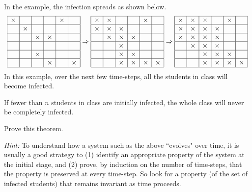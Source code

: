\documentclass[twoside,12pt]{article}
\begin{document}
\begin{problem}{12}
In the example, the infection spreads as shown below.
%
\[
\begin{array}{|c|c|c|c|c|c|}
\hline
\times& & & &\times& \\ \hline
 &\times& & & & \\ \hline
& &\times&\times& & \\ \hline
& & & & & \\ \hline
& &\times& & & \\ \hline
& & &\times& &\times \\ \hline
\end{array}
\Rightarrow
\begin{array}{|c|c|c|c|c|c|}
\hline
\times&\times& & &\times& \\ \hline
\times&\times&\times& & & \\ \hline
&\times&\times&\times& & \\ \hline
& &\times& & & \\ \hline
& &\times&\times& & \\ \hline
& &\times&\times&\times&\times \\ \hline
\end{array}
\Rightarrow
\begin{array}{|c|c|c|c|c|c|}
\hline
\times&\times&\times& &\times& \\ \hline
\times&\times&\times&\times& & \\ \hline
\times&\times&\times&\times& & \\ \hline
&\times&\times&\times& & \\ \hline
& &\times&\times&\times& \\ \hline
& &\times&\times&\times&\times \\ \hline
\end{array}
\]
%
In this example, over the next few time-steps, all the students in class will become infected.

\begin{theorem*}
If fewer than $n$ students in class are initially infected, the whole class will never be completely infected.
\end{theorem*}

Prove this theorem.

\textit{ Hint:} To understand how a system such as the above ``evolves" over time, it is usually a good strategy to (1) identify an appropriate  property of the system at the initial stage, and (2) prove, by induction on the number of time-steps, that the property is preserved at every time-step. So look for a property (of the set of infected students) that remains invariant as time proceeds.


\end{problem}
\end{document}
